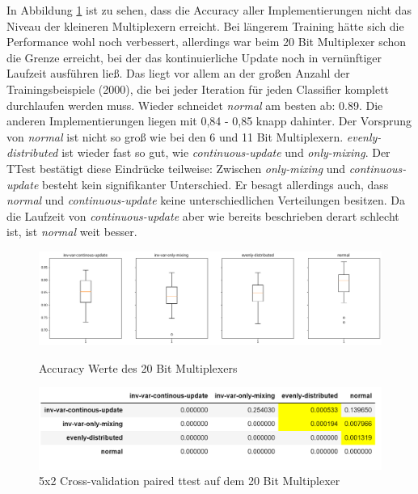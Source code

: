 \documentclass[10pt]{ocsmnar}
\begin{document}
In Abbildung \ref{boxplot-20-bit} ist zu sehen, dass die Accuracy aller Implementierungen nicht das Niveau der kleineren Multiplexern erreicht. Bei längerem Training hätte sich die Performance wohl noch verbessert, allerdings war beim 20 Bit Multiplexer schon die Grenze erreicht, bei der das kontinuierliche Update noch in vernünftiger Laufzeit ausführen ließ. Das liegt vor allem an der großen Anzahl der Trainingsbeispiele (2000), die bei jeder Iteration für jeden Classifier komplett durchlaufen werden muss. 
Wieder schneidet \textit{normal} am besten ab: 0.89. Die anderen Implementierungen liegen mit 0,84 - 0,85 knapp dahinter. Der Vorsprung von \textit{normal} ist nicht so groß wie bei den 6 und 11 Bit Multiplexern.
\textit{evenly-distributed} ist wieder fast so gut, wie \textit{continuous-update} und \textit{only-mixing}.  
Der TTest bestätigt diese Eindrücke teilweise: Zwischen \textit{only-mixing} und \textit{continuous-update} besteht kein signifikanter Unterschied. Er besagt allerdings auch, dass \textit{normal} und \textit{continuous-update} keine unterschiedlichen Verteilungen besitzen. Da die Laufzeit von \textit{continuous-update} aber wie bereits beschrieben derart schlecht ist, ist \textit{normal} weit besser. 


\begin{figure}[h]
    \includegraphics[width=\linewidth]{img/boxplot_20_bit.png}
    \caption{Accuracy Werte des 20 Bit Multiplexers}
    \label{boxplot-20-bit}
\end{figure}


\begin{figure}[h]
    \includegraphics[width=\linewidth]{img/ttest_20_bit.png}
    \caption{5x2 Cross-validation paired ttest auf dem 20 Bit Multiplexer}\label{ttest-20-bit}
\end{figure}
\end{document}
